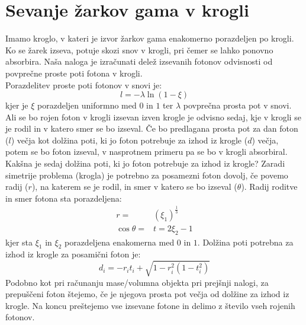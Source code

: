 \documentclass[slovene,11pt,a4paper]{article}
\numberwithin{equation}{section} %
\numberwithin{figure}{section} %
\numberwithin{table}{section} %
\begin{document}
\section{Sevanje žarkov gama v krogli}
Imamo kroglo, v kateri je izvor žarkov gama enakomerno porazdeljen po krogli. Ko se žarek izseva, potuje skozi snov v krogli, pri čemer se lahko ponovno absorbira. Naša naloga je izračunati delež izsevanih fotonov odvisnosti od povprečne proste poti fotona v krogli.\\
Porazdelitev proste poti fotonov v snovi je:
\begin{equation}
l=-\lambda \ln(1-\xi )
\end{equation}
kjer je $\xi$ porazdeljen uniformno med $0$ in $1$ ter $\lambda$ povprečna prosta pot v snovi. Ali se bo rojen foton v krogli izsevan izven krogle je odvisno sedaj, kje v krogli se je rodil in v katero smer se bo izseval. Če bo predlagana prosta pot za dan foton ($l$) večja kot dolžina poti, ki jo foton potrebuje za izhod iz krogle ($d$) večja, potem se bo foton izseval, v nasprotnem primeru pa se bo v krogli absorbiral. Kakšna je sedaj dolžina poti, ki jo foton potrebuje za izhod iz krogle? Zaradi simetrije problema (krogla) je potrebno za posamezni foton dovolj, če povemo radij ($r$), na katerem se je rodil, in smer v katero se bo izseval ($\theta$). Radij roditve in smer fotona sta porazdeljena:
\begin{equation}
\begin{aligned}
r=&(\xi_1)^{\frac{1}{3}} \\
\cos \theta =&t = 2 \xi_2 -1
\end{aligned}
\end{equation}
kjer sta $\xi_1$ in $\xi_2$ porazdeljena enakomerna med $0$ in $1$. Dolžina poti potrebna za izhod iz krogle za posamični foton je:
\begin{equation}
d_i=-r_i t_i+\sqrt{1-r_i^2(1-t_i^2)}
\end{equation}
Podobno kot pri računanju mase/volumna objekta pri prejšnji nalogi, za prepuščeni foton štejemo, če je njegova prosta pot večja od dolžine za izhod iz krogle. Na koncu preštejemo vse izsevane fotone in delimo z število vseh rojenih fotonov.
\end{document}
